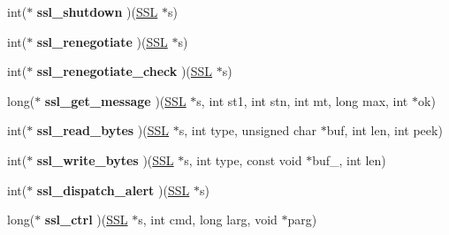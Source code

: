 \begin{DoxyCompactItemize}
\item 
\mbox{\label{structssl__method__st_a7dc97d1a59c10baa705a23e5aa4f7546}} 
int($\ast$ {\bfseries ssl\+\_\+shutdown} )(\hyperlink{structssl__st}{S\+SL} $\ast$s)
\item 
\mbox{\label{structssl__method__st_a68ba7cb568d9c9c3e2bd15020a30beb0}} 
int($\ast$ {\bfseries ssl\+\_\+renegotiate} )(\hyperlink{structssl__st}{S\+SL} $\ast$s)
\item 
\mbox{\label{structssl__method__st_a07e92db03c1a7907ed8346916c038215}} 
int($\ast$ {\bfseries ssl\+\_\+renegotiate\+\_\+check} )(\hyperlink{structssl__st}{S\+SL} $\ast$s)
\item 
\mbox{\label{structssl__method__st_a128347c6e6007078bc17af9c64b566f3}} 
long($\ast$ {\bfseries ssl\+\_\+get\+\_\+message} )(\hyperlink{structssl__st}{S\+SL} $\ast$s, int st1, int stn, int mt, long max, int $\ast$ok)
\item 
\mbox{\label{structssl__method__st_a9f992bd27f8e79cf166c9783bdc29932}} 
int($\ast$ {\bfseries ssl\+\_\+read\+\_\+bytes} )(\hyperlink{structssl__st}{S\+SL} $\ast$s, int type, unsigned char $\ast$buf, int len, int peek)
\item 
\mbox{\label{structssl__method__st_a20933c416539a546d3749a725e0602e7}} 
int($\ast$ {\bfseries ssl\+\_\+write\+\_\+bytes} )(\hyperlink{structssl__st}{S\+SL} $\ast$s, int type, const void $\ast$buf\+\_\+, int len)
\item 
\mbox{\label{structssl__method__st_a1164901a31bb98ce046b971a09b29321}} 
int($\ast$ {\bfseries ssl\+\_\+dispatch\+\_\+alert} )(\hyperlink{structssl__st}{S\+SL} $\ast$s)
\item 
\mbox{\label{structssl__method__st_a00f03ff5d9c47885e4cf9340ccb91dd8}} 
long($\ast$ {\bfseries ssl\+\_\+ctrl} )(\hyperlink{structssl__st}{S\+SL} $\ast$s, int cmd, long larg, void $\ast$parg)
\item 
\mbox{\label{structssl__method__st_a894ef584342f0b95ab4156cada689c99}} 

\end{DoxyCompactItemize}
